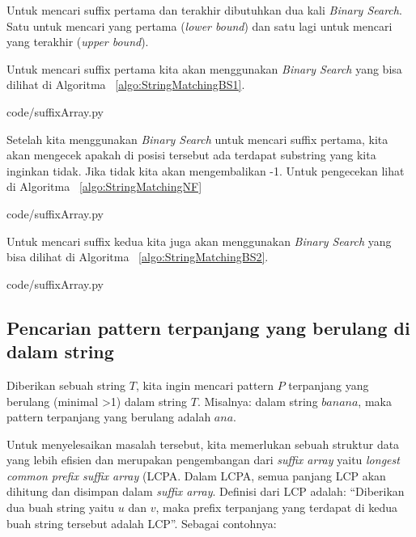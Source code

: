 Untuk mencari suffix pertama dan terakhir dibutuhkan dua kali \textit{Binary Search}. Satu untuk mencari yang pertama (\textit{lower bound}) dan satu lagi untuk mencari yang terakhir (\textit{upper bound}).

Untuk mencari suffix pertama kita akan menggunakan \textit{Binary Search} yang bisa dilihat di Algoritma ~\ref{algo:StringMatchingBS1}.


                {code/suffixArray.py}

Setelah kita menggunakan \textit{Binary Search} untuk mencari suffix pertama, kita akan mengecek apakah di posisi tersebut ada terdapat substring yang kita inginkan tidak. Jika tidak kita akan mengembalikan -1. Untuk pengecekan lihat di Algoritma ~\ref{algo:StringMatchingNF} 


                {code/suffixArray.py}

Untuk mencari suffix kedua kita juga akan menggunakan \textit{Binary Search} yang bisa dilihat di Algoritma ~\ref{algo:StringMatchingBS2}.


                {code/suffixArray.py}



\subsection{Pencarian pattern terpanjang yang berulang di dalam string}

Diberikan sebuah string $T$, kita ingin mencari pattern $P$ terpanjang yang berulang (minimal >1) dalam string $T$. Misalnya: dalam string $banana$, maka pattern terpanjang yang berulang adalah $ana$.

Untuk menyelesaikan masalah tersebut, kita memerlukan sebuah struktur data yang lebih efisien dan merupakan pengembangan dari \textit{suffix array} yaitu \textit{longest common prefix suffix array} (LCPA. Dalam LCPA, semua panjang LCP akan dihitung dan disimpan dalam \textit{suffix array}. Definisi dari LCP adalah: ``Diberikan dua buah string yaitu $u$ dan $v$, maka prefix terpanjang yang terdapat di kedua buah string tersebut adalah LCP''. Sebagai contohnya:

